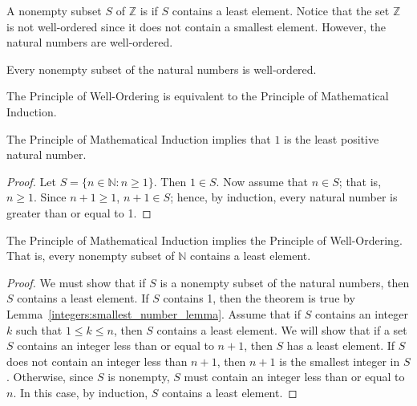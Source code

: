 \medskip

A  nonempty subset $S$ of ${\mathbb Z}$ is  if $S$ contains a least element.  Notice that the set ${\mathbb Z}$ is not well-ordered since it does not contain a smallest element.  However, the natural numbers are well-ordered. 
 
\medskip
 
Every nonempty subset of the natural numbers is well-ordered. 

\medskip
 
The Principle of Well-Ordering is equivalent to the Principle  of Mathematical Induction. 
 
\begin{lemma}\label{integers:smallest_number_lemma}
The Principle of Mathematical Induction implies that $1$ is the least positive natural number. 
\end{lemma}

\begin{proof}
Let $S = \{ n \in {\mathbb N} : n \geq 1 \}$. Then $1 \in S$.  Now assume that $n \in S$; that is, $n \geq 1$.  Since $n+1 \geq 1$, $n+ 1 \in S$; hence, by induction, every natural number is greater than or equal to 1. 
\end{proof}

\begin{theorem}\label{integers_PMI_implies_PWO}
The Principle of Mathematical Induction implies the Principle of Well-Ordering.  That is, every nonempty subset of $\mathbb N$ contains a least element.
\end{theorem}
 
\begin{proof}
We must show that if $S$ is a nonempty subset of the natural numbers, then $S$ contains a least element.  If $S$ contains 1, then the theorem is true by Lemma~\ref{integers:smallest_number_lemma}.  Assume that if $S$ contains an integer $k$ such that $1 \leq k \leq n$, then $S$ contains a least element.  We will show that if a set $S$ contains an integer less than or equal to $n + 1$, then $S$ has a least element.  If $S$ does not contain an integer less than $n+1$, then $n+1$ is the smallest integer in $S$.  Otherwise, since $S$ is nonempty, $S$ must contain an integer less than or equal to $n$. In this case, by induction, $S$ contains a least element. 
\hspace*{1in} 
\end{proof}


